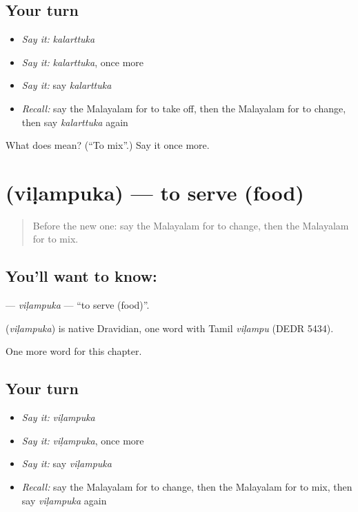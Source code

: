 \subsection*{Your turn}
\begin{itemize}
\raggedright
  \item \emph{Say it:} \emph{kalarttuka}
  \item \emph{Say it:} \emph{kalarttuka}, once more
  \item \emph{Say it:} say \emph{kalarttuka}
  \item \emph{Recall:} say the Malayalam for to take off, then the Malayalam for to change, then say \emph{kalarttuka} again
\end{itemize}

\begin{tcolorbox}[breakable,colback=teal!4,colframe=teal!35!black,title={Before you move on}]
What does  mean? (\textquotedblleft{}To mix\textquotedblright{}.) Say it once more.
\end{tcolorbox}
\section[\texorpdfstring{\ml{വിളമ്പുക} (viḷampuka)}{വിളമ്പുക (viḷampuka)}]{ (viḷampuka) — to serve (food)}

\label{lesson:ML-C224-vilambuka}



\begin{quote}
Before the new one: say the Malayalam for to change, then the Malayalam for to mix.
\end{quote}

\subsection*{You'll want to know: }
\textbf{} — \emph{viḷampuka} — \textquotedblleft{}to serve (food)\textquotedblright{}.

\begin{cousinweb}
\textbf{} (\emph{viḷampuka}) is native Dravidian, one word with Tamil \emph{viḷampu} (DEDR 5434).
\end{cousinweb}

\begin{grammarlens}[title={What you've built}]
One more word for this chapter.
\end{grammarlens}

\subsection*{Your turn}
\begin{itemize}
\raggedright
  \item \emph{Say it:} \emph{viḷampuka}
  \item \emph{Say it:} \emph{viḷampuka}, once more
  \item \emph{Say it:} say \emph{viḷampuka}
  \item \emph{Recall:} say the Malayalam for to change, then the Malayalam for to mix, then say \emph{viḷampuka} again
\end{itemize}

